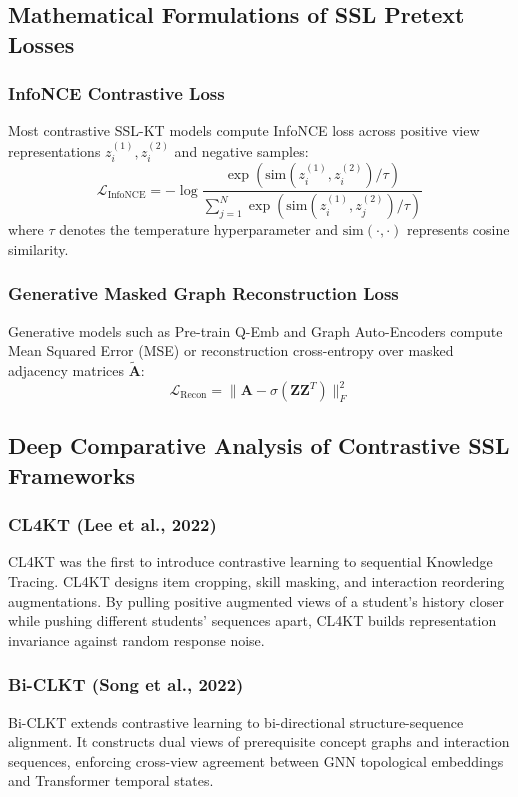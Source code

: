 \documentclass[10pt,journal,compsoc]{IEEEtran}
\begin{document}
\subsection{Mathematical Formulations of SSL Pretext Losses}

\subsubsection{InfoNCE Contrastive Loss}
Most contrastive SSL-KT models compute InfoNCE loss across positive view representations $z_i^{(1)}, z_i^{(2)}$ and negative samples:
\begin{equation}
\mathcal{L}_{\text{InfoNCE}} = -\log \frac{\exp(\text{sim}(z_i^{(1)}, z_i^{(2)}) / \tau)}{\sum_{j=1}^{N} \exp(\text{sim}(z_i^{(1)}, z_j^{(2)}) / \tau)}
\end{equation}
where $\tau$ denotes the temperature hyperparameter and $\text{sim}(\cdot, \cdot)$ represents cosine similarity.

\subsubsection{Generative Masked Graph Reconstruction Loss}
Generative models such as Pre-train Q-Emb \cite{KT026_PretrainQ_2020} and Graph Auto-Encoders compute Mean Squared Error (MSE) or reconstruction cross-entropy over masked adjacency matrices $\tilde{\mathbf{A}}$:
\begin{equation}
\mathcal{L}_{\text{Recon}} = \|\mathbf{A} - \sigma(\mathbf{Z} \mathbf{Z}^T)\|_F^2
\end{equation}

\subsection{Deep Comparative Analysis of Contrastive SSL Frameworks}

\subsubsection{CL4KT (Lee et al., 2022)}
CL4KT \cite{KT039_CL4KT_2022} was the first to introduce contrastive learning to sequential Knowledge Tracing. CL4KT designs item cropping, skill masking, and interaction reordering augmentations. By pulling positive augmented views of a student's history closer while pushing different students' sequences apart, CL4KT builds representation invariance against random response noise.

\subsubsection{Bi-CLKT (Song et al., 2022)}
Bi-CLKT \cite{KT011_BiCLKT_2022} extends contrastive learning to bi-directional structure-sequence alignment. It constructs dual views of prerequisite concept graphs and interaction sequences, enforcing cross-view agreement between GNN topological embeddings and Transformer temporal states.
\end{document}
